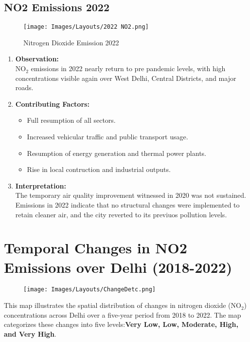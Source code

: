 \documentclass[12pt]{report}
\begin{document}
\subsection{NO2 Emissions 2022}
\begin{figure}[H]
    \centering
    \texttt{[image: Images/Layouts/2022 NO2.png]}
    \caption{Nitrogen Dioxide Emission 2022} 
\end{figure}
\begin{enumerate}
    \item \textbf{Observation:}\\
    NO$_2$ emissions in 2022 nearly return to pre pandemic levels, with high concentrations visible again over West Delhi, Central Districts, and major roads.
    \item \textbf{Contributing Factors:}
    \begin{itemize}
        \item Full resumption of all sectors.
        \item Increased vehicular traffic and public transport usage.
        \item Resumption of energy generation and thermal power plants.
        \item Rise in local contruction and industrial outputs.
    \end{itemize}
    \item \textbf{Interpretation:}\\
    The temporary air quality improvement witnessed in 2020 was not sustained. Emissions in 2022 indicate that no structural changes were implemented to retain cleaner air, and the city reverted to its previuos pollution levels.
\end{enumerate}
\section{Temporal Changes in NO2 Emissions over Delhi (2018-2022)}
\begin{figure}[H]
    \centering
    \texttt{[image: Images/Layouts/ChangeDetc.png]}
\end{figure}
This map illustrates the spatial distribution of changes in nitrogen dioxide (NO$_2$) concentrations across Delhi over a five-year period from 2018 to 2022. The map categorizes these changes into five levels:\textbf{Very Low, Low, Moderate, High, and Very High}.
\end{document}
